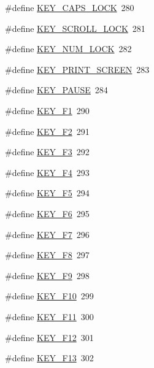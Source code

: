 \begin{DoxyCompactItemize}
\item 
\#define \hyperlink{group___keys_gaaac34940ff83d1431044aaca015639ce}{K\-E\-Y\-\_\-\-C\-A\-P\-S\-\_\-\-L\-O\-C\-K}~280
\item 
\#define \hyperlink{group___keys_gab94d4309f6059492ef7dbf1a880cf7e0}{K\-E\-Y\-\_\-\-S\-C\-R\-O\-L\-L\-\_\-\-L\-O\-C\-K}~281
\item 
\#define \hyperlink{group___keys_gaccb7a413ed6fa7db7192fc957d477ab8}{K\-E\-Y\-\_\-\-N\-U\-M\-\_\-\-L\-O\-C\-K}~282
\item 
\#define \hyperlink{group___keys_ga77e8247cb7e0a962a50ecdc6c1dd4a8d}{K\-E\-Y\-\_\-\-P\-R\-I\-N\-T\-\_\-\-S\-C\-R\-E\-E\-N}~283
\item 
\#define \hyperlink{group___keys_gae176aa9af3d2acaeba5b8453aff5bbbf}{K\-E\-Y\-\_\-\-P\-A\-U\-S\-E}~284
\item 
\#define \hyperlink{group___keys_ga2772a1f7024ba1fd62e88ec1adb541f8}{K\-E\-Y\-\_\-\-F1}~290
\item 
\#define \hyperlink{group___keys_gae2e2edb31bb7796786da12f85f2d5cd1}{K\-E\-Y\-\_\-\-F2}~291
\item 
\#define \hyperlink{group___keys_ga38ebe8e5c5f1d5727c9638bf79fc3952}{K\-E\-Y\-\_\-\-F3}~292
\item 
\#define \hyperlink{group___keys_gab99474b01ffcbc57d74b60a77895e5e8}{K\-E\-Y\-\_\-\-F4}~293
\item 
\#define \hyperlink{group___keys_ga2a0aae1931111382ade29fd75ef64790}{K\-E\-Y\-\_\-\-F5}~294
\item 
\#define \hyperlink{group___keys_gad31281b771b8b85f4aa98bbd527d91a0}{K\-E\-Y\-\_\-\-F6}~295
\item 
\#define \hyperlink{group___keys_ga7eed6766ef9ddb721c6a2bce807fc9dc}{K\-E\-Y\-\_\-\-F7}~296
\item 
\#define \hyperlink{group___keys_ga7a8ad03f07f2e4757a70385e88fbbe3c}{K\-E\-Y\-\_\-\-F8}~297
\item 
\#define \hyperlink{group___keys_ga417a382624f91fb0cdfdf1c33adc8c90}{K\-E\-Y\-\_\-\-F9}~298
\item 
\#define \hyperlink{group___keys_gad37282615edb2c357149c2a1342b4a85}{K\-E\-Y\-\_\-\-F10}~299
\item 
\#define \hyperlink{group___keys_gabd820bb8b4b2a47e4210401b13789106}{K\-E\-Y\-\_\-\-F11}~300
\item 
\#define \hyperlink{group___keys_ga0a3de83275f6bbc2b88692f947f0d595}{K\-E\-Y\-\_\-\-F12}~301
\item 
\#define \hyperlink{group___keys_gaf87d33df472dd073863b12035c7bd1d4}{K\-E\-Y\-\_\-\-F13}~302

\end{DoxyCompactItemize}
